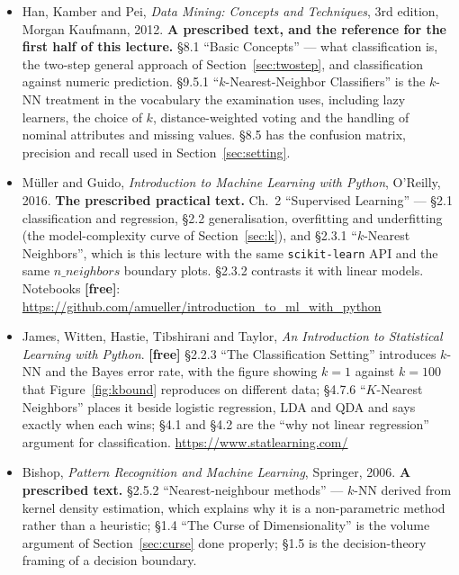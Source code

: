\documentclass[11pt]{article}
\begin{document}
\begin{itemize}[leftmargin=*]
  \item Han, Kamber and Pei, \emph{Data Mining: Concepts and Techniques}, 3rd
    edition, Morgan Kaufmann, 2012. \textbf{A prescribed text, and the
    reference for the first half of this lecture.} \S8.1 ``Basic Concepts'' ---
    what classification is, the two-step general approach of
    Section~\ref{sec:twostep}, and classification against numeric prediction.
    \S9.5.1 ``$k$-Nearest-Neighbor Classifiers'' is the $k$-NN treatment in the
    vocabulary the examination uses, including lazy learners, the choice of
    $k$, distance-weighted voting and the handling of nominal attributes and
    missing values. \S8.5 has the confusion matrix, precision and recall used
    in Section~\ref{sec:setting}.
  \item M\"uller and Guido, \emph{Introduction to Machine Learning with
    Python}, O'Reilly, 2016. \textbf{The prescribed practical text.} Ch.~2
    ``Supervised Learning'' --- \S2.1 classification and regression, \S2.2
    generalisation, overfitting and underfitting (the model-complexity curve of
    Section~\ref{sec:k}), and \S2.3.1 ``$k$-Nearest Neighbors'', which is this
    lecture with the same \texttt{scikit-learn} API and the same $n\_neighbors$
    boundary plots. \S2.3.2 contrasts it with linear models. Notebooks
    \textbf{[free]}:
    \url{https://github.com/amueller/introduction_to_ml_with_python}
  \item James, Witten, Hastie, Tibshirani and Taylor, \emph{An Introduction to
    Statistical Learning with Python}. \textbf{[free]} \S2.2.3 ``The
    Classification Setting'' introduces $k$-NN and the Bayes error rate, with
    the figure showing $k=1$ against $k=100$ that Figure~\ref{fig:kbound}
    reproduces on different data; \S4.7.6 ``$K$-Nearest Neighbors'' places it
    beside logistic regression, LDA and QDA and says exactly when each wins;
    \S4.1 and \S4.2 are the ``why not linear regression'' argument for
    classification. \url{https://www.statlearning.com/}
  \item Bishop, \emph{Pattern Recognition and Machine Learning}, Springer,
    2006. \textbf{A prescribed text.} \S2.5.2 ``Nearest-neighbour methods'' ---
    $k$-NN derived from kernel density estimation, which explains why it is a
    non-parametric method rather than a heuristic; \S1.4 ``The Curse of
    Dimensionality'' is the volume argument of Section~\ref{sec:curse} done
    properly; \S1.5 is the decision-theory framing of a decision boundary.

\end{itemize}
\end{document}
